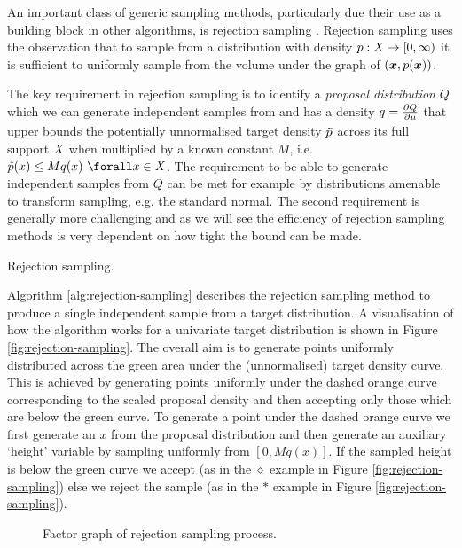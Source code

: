 An important class of generic sampling methods, particularly due their use as a building block in other algorithms, is rejection sampling \citep{vonneumann1951various}. Rejection sampling uses the observation that to sample from a distribution with density $p : \mathit{X} \to [0, \infty)$ it is sufficient to uniformly sample from the volume under the graph of $\lpa\vct{x}, \tgtdens(\vct{x})\rpa$.

The key requirement in rejection sampling is to identify a \emph{proposal distribution} $Q$ which we can generate independent samples from and has a density $q=\frac{\partial Q}{\partial \mu}$ that upper bounds the potentially unnormalised target density $\tilde{p}$ across its full support $\mathit{X}$ when multiplied by a known constant $M$, i.e. $\utgtdens(x) \leq M q(x) ~\forall x \in \set{X}$. The requirement to be able to generate independent samples from $Q$ can be met for example by distributions amenable to transform sampling, e.g. the standard normal. The second requirement is generally more challenging and as we will see the efficiency of rejection sampling methods is very dependent on how tight the bound can be made.

\begin{algorithm}[!t]
\caption{Rejection sampling.}
\label{alg:rejection-sampling}

\end{algorithm}

Algorithm \ref{alg:rejection-sampling} describes the rejection sampling method to produce a single independent sample from a target distribution. A visualisation of how the algorithm works for a univariate target distribution is shown in Figure \ref{fig:rejection-sampling}. The overall aim is to generate points uniformly distributed across the green area under the (unnormalised) target density curve. This is achieved by generating points uniformly under the dashed orange curve corresponding to the scaled proposal density and then accepting only those which are below the green curve. To generate a point under the dashed orange curve we first generate an $x$ from the proposal distribution and then generate an auxiliary `height' variable by sampling uniformly from $[0, Mq(x)]$. If the sampled height is below the green curve we accept (as in the $\diamond$ example in Figure \ref{fig:rejection-sampling}) else we reject the sample (as in the $*$ example in Figure \ref{fig:rejection-sampling}).

\begin{figure}[t]
\centering
{}
\caption{Factor graph of rejection sampling process.}
\label{fig:rejection-sampling-factor-graph}
\end{figure}

